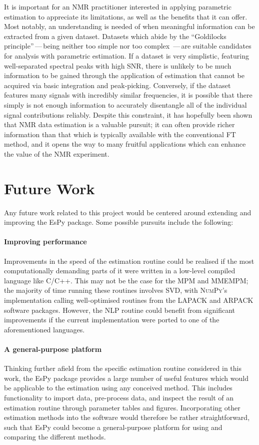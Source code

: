 It is important for an \ac{NMR} practitioner interested in applying
parametric estimation to appreciate its limitations, as well as the
benefits that it can offer. Most notably, an understanding is needed of when
meaningful information can be extracted from a given dataset.
Datasets which abide by the ``Goldilocks principle''\,---\,being neither too
simple nor too complex \,---\,are suitable candidates for analysis with
parametric estimation.
If a dataset is very simplistic, featuring well-separated
spectral peaks with high \ac{SNR}, there is unlikely to be much information
to be gained through the application of estimation that cannot be acquired via
basic integration and peak-picking.
Conversely, if the dataset features many signals with incredibly similar
frequencies, it is possible that there simply is not enough
information to accurately disentangle all of the individual signal
contributions reliably.
Despite this constraint, it has hopefully been shown that \ac{NMR} data
estimation is a valuable pursuit; it can often provide richer information than
that which is typically available with the conventional \ac{FT} method, and it
opens the way to many fruitful applications which can enhance the value of the
\ac{NMR} experiment.

\section{Future Work}
\label{sec:future-work}
Any future work related to this project would be centered around extending and
improving the \ac{EsPy} package. Some possible pursuits include the following:

\paragraph{Improving performance}
Improvements in the speed of the estimation routine
could be realised if the most computationally demanding parts of it were
written in a low-level compiled language like C/C++. This may not
be the case for the \ac{MPM} and \ac{MMEMPM}; the majority of time running
these routines involves \ac{SVD}, with \textsc{NumPy}'s implementation calling
well-optimised routines from the \textsc{LAPACK} and \textsc{ARPACK} software
packages. However, the \ac{NLP} routine could
benefit from significant improvements if the current \Python implementation
were ported to one of the aforementioned languages.

\paragraph{A general-purpose platform}
Thinking further afield from the specific estimation routine considered in this
work, the \ac{EsPy} package provides a large number of useful features which
would be applicable to the estimation using any conceived method. This includes
functionality to import data, pre-process data, and inspect the result of an
estimation routine through parameter tables and figures.
Incorporating other estimation methods into the software would therefore be
rather straightforward, such that \ac{EsPy} could become a general-purpose
platform for using and comparing the different methods.

